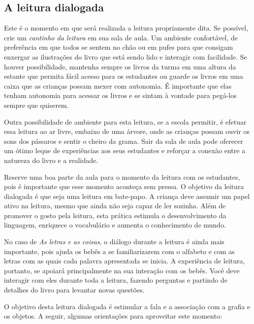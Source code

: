 \documentclass[11pt]{extarticle}
\begin{document}
\subsection{A leitura dialogada}
Este é o momento em que será realizada a leitura propriamente dita. 
Se possível, crie um \textit{cantinho da leitura} em sua sala de aula. Um 
ambiente confortável, de preferência em que todos se sentem no chão ou 
em pufes para que consigam enxergar as ilustrações do livro que está 
sendo lido e interagir com facilidade. Se houver possibilidade, mantenha 
sempre os livros da turma em uma altura da estante que permita fácil 
acesso para os estudantes ou guarde os livros em uma caixa que as crianças 
possam mexer com autonomia. É importante que elas tenham autonomia para 
acessar os livros e se sintam à vontade para pegá-los sempre que quiserem. 


Outra possibilidade de ambiente para esta leitura, se a escola permitir, 
é efetuar essa leitura ao ar livre, embaixo de uma árvore, onde as crianças 
possam ouvir os sons dos pássaros e sentir o cheiro da grama. Sair da sala 
de aula pode oferecer um ótimo leque de experiências aos seus estudantes e 
reforçar a conexão entre a natureza do livro e a realidade.  

Reserve uma boa parte da aula para o momento da leitura com os estudantes, 
pois é importante que esse momento aconteça sem pressa. O objetivo da 
leitura dialogada é que seja uma leitura em bate-papo. A criança deve 
assumir um papel ativo na leitura, mesmo que ainda não seja capaz de 
ler sozinha. Além de promover o gosto pela leitura, esta prática estimula 
o desenvolvimento da linguagem, enriquece o vocabulário e 
aumenta o conhecimento de mundo.

No caso de \textit{As letras e as coisas}, o diálogo durante a leitura é 
ainda mais importante, pois ajuda os bebês a se familiarizarem com o alfabeto e com as letras com as quais cada palavra apresentada se inicia.
A experiência de leitura, portanto, se apoiará principalmente na sua interação com os bebês. 
Você deve interagir com eles durante toda a 
leitura, fazendo perguntas e partindo de detalhes do livro para 
levantar novas questões. 

O objetivo desta leitura dialogada é estimular a fala e a associação com a grafia e os objetos.
A seguir, algumas orientações para aproveitar este momento: 
\end{document}
